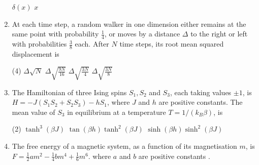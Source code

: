 \begin{enumerate}
\begin{tasks}
	\task[\textbf{b.}]$\delta(x)$
	\task[\textbf{c.}]$x$
\end{tasks}
\item At each time step, a random walker in one dimension either remains at the same point with probability $\frac{1}{4}$, or moves by a distance $\Delta$ to the right or left with probabilities $\frac{3}{8}$ each. After $N$ time steps, its root mean squared displacement is
 \begin{tasks}(4)
	\task[\textbf{a.}]$\Delta \sqrt{N}$
	\task[\textbf{b.}] $\Delta \sqrt{\frac{9 N}{16}}$
	\task[\textbf{c.}]$\Delta \sqrt{\frac{3 N}{4}}$
	\task[\textbf{d.}] $\Delta \sqrt{\frac{3 N}{8}}$
\end{tasks}
\item The Hamiltonian of three Ising spins $S_{1}, S_{2}$ and $S_{3}$, each taking values $\pm 1$, is $H=-J\left(S_{1} S_{2}+S_{2} S_{3}\right)-h S_{1}$, where $J$ and $h$ are positive constants. The mean value of $S_{3}$ in equilibrium at a temperature $T=1 /\left(k_{B} \beta\right)$, is
 \begin{tasks}(2)
	\task[\textbf{a.}]$\tanh ^{3}(\beta J)$
	\task[\textbf{b.}]$\tan (\beta h) \tanh ^{2}(\beta J)$
	\task[\textbf{c.}]$\sinh (\beta h) \sinh ^{2}(\beta J)$
\end{tasks}
\item The free energy of a magnetic system, as a function of its magnetisation $m$, is $F=\frac{1}{2} a m^{2}-\frac{1}{4} b m^{4}+\frac{1}{6} m^{6}$. where $a$ and $b$ are positive constants $.$


\end{enumerate}
